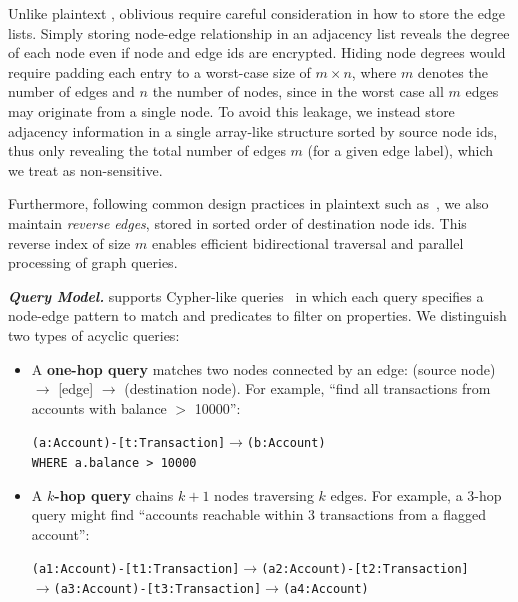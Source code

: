 Unlike plaintext \gdbs, oblivious \gdbs require careful consideration in how to store the
edge lists. Simply storing node-edge relationship in an adjacency list reveals the degree of 
each node even if node and edge ids are encrypted. Hiding node degrees would require padding 
each entry to a worst-case size of $m \times n$, where $m$ denotes the number of edges and $n$ 
the number of nodes, since in the worst case all $m$ edges may originate from a single node.
To avoid this leakage, we instead store adjacency information in a single array-like structure 
sorted by source node ids, thus only revealing the total number of edges $m$ (for a given edge 
label), which we treat as non-sensitive.

Furthermore, following common design practices in plaintext \gdbs such 
as~\cite{janusgraph,feng2023kuzu,deutsch2019tigergraph,sun2015sqlgraph}, we also maintain 
\textit{reverse edges}, stored in sorted order of destination node ids. This reverse index of 
size $m$ enables efficient bidirectional traversal and parallel processing of graph 
queries. 


\noindent\textbf{\textit{Query Model.}} \system supports Cypher-like queries~\cite{francis2018cypher, opencypher} in 
which each query specifies a node-edge pattern to match and predicates to 
filter on properties. We distinguish two types of acyclic queries:

\begin{itemize}[leftmargin=*]
    \item A \textbf{one-hop query} matches two nodes connected by an edge: (source node) $\rightarrow$ [edge] $\rightarrow$ (destination node). For example, ``find all transactions from accounts with balance $>$ 10000'':
    \begin{center}
    \texttt{(a:Account)-[t:Transaction]$\rightarrow$(b:Account)}\\
    \texttt{WHERE a.balance > 10000}
    \end{center}

    \item A \textbf{$k$-hop query} chains $k+1$ nodes traversing $k$ edges. For example, a 3-hop query might find ``accounts reachable within 3 transactions from a flagged account'':
    \begin{center}
    \small\texttt{(a1:Account)-[t1:Transaction]$\rightarrow$(a2:Account)-[t2:Transaction]\\
    $\rightarrow$}\small\texttt{(a3:Account)-[t3:Transaction]$\rightarrow$(a4:Account)}
    \end{center}
\end{itemize}

